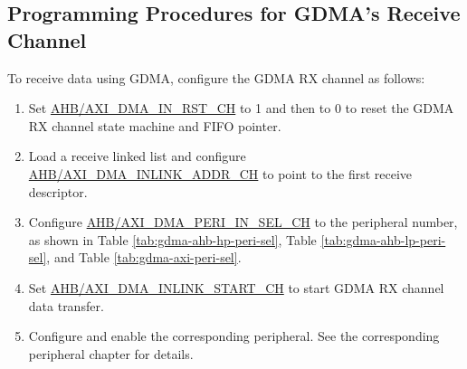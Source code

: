 \documentclass[main\_\_EN.tex]{subfiles}
\begin{document}
\subsection{Programming Procedures for GDMA's Receive Channel}
To receive data using GDMA, configure the GDMA RX channel as follows:
\begin{enumerate}
    \item Set \hyperref[fielddesc:AHBDMAINRSTCHN]{AHB/AXI\_DMA\_IN\_RST\_CH} to 1 and then to 0 to reset the GDMA RX channel state machine and FIFO pointer.
    \item Load a receive linked list and configure \hyperref[fielddesc:AHBDMAINLINKADDRCHN]{AHB/AXI\_DMA\_INLINK\_ADDR\_CH} to point to the first receive descriptor.
    \item Configure \hyperref[fielddesc:AHBDMAPERIINSELCHN]{AHB/AXI\_DMA\_PERI\_IN\_SEL\_CH} to the peripheral number, as shown in Table \ref{tab:gdma-ahb-hp-peri-sel}, Table \ref{tab:gdma-ahb-lp-peri-sel}, and Table \ref{tab:gdma-axi-peri-sel}.
    \item Set \hyperref[fielddesc:AHBDMAINLINKSTARTCHN]{AHB/AXI\_DMA\_INLINK\_START\_CH} to start GDMA RX channel data transfer.
    \item Configure and enable the corresponding peripheral. See the corresponding peripheral chapter for details.
\end{enumerate}
\end{document}
